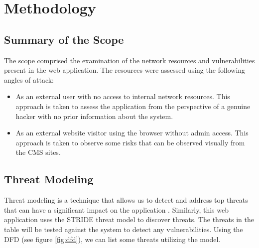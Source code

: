 \chapter{Methodology}
\section{Summary of the Scope}
The scope comprised the examination of the network resources and vulnerabilities present in the web application. The resources were assessed using the following angles of attack:
\begin{itemize}
    \item As an external user with no access to internal network resources. This approach is taken to assess the application from the perspective of a genuine hacker with no prior information about the system.
    \item As an external website visitor using the browser without admin access. This approach is taken to observe some risks that can be observed visually from the CMS sites.
\end{itemize}

\section{Threat Modeling}
Threat modeling is a technique that allows us to detect and address top threats that can have a significant impact on the application \citep{threat_modeling}. Similarly, this web application uses the STRIDE threat model to discover threats. The threats in the table will be tested against the system to detect any vulnerabilities.
Using the DFD (see figure \ref{fig:dfd}), we can list some threats utilizing the model.

